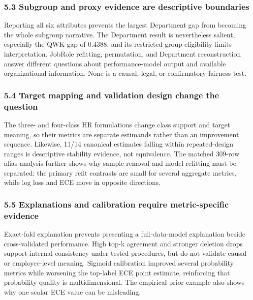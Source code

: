\documentclass[
  a4paper,
  review]{elsarticle}
\begin{document}
\subsubsection{5.3 Subgroup and proxy evidence are descriptive
boundaries}\label{subgroup-and-proxy-evidence-are-descriptive-boundaries}

Reporting all six attributes prevents the largest Department gap from
becoming the whole subgroup narrative. The Department result is
nevertheless salient, especially the QWK gap of 0.4388, and its
restricted group eligibility limits interpretation. JobRole refitting,
permutation, and Department reconstruction answer different questions
about performance-model output and available organizational information.
None is a causal, legal, or confirmatory fairness test.

\subsubsection{5.4 Target mapping and validation design change the
question}\label{target-mapping-and-validation-design-change-the-question}

The three- and four-class HR formulations change class support and
target meaning, so their metrics are separate estimands rather than an
improvement sequence. Likewise, 11/14 canonical estimates falling within
repeated-design ranges is descriptive stability evidence, not
equivalence. The matched 309-row alias analysis further shows why sample
removal and model refitting must be separated: the primary refit
contrasts are small for several aggregate metrics, while log loss and
ECE move in opposite directions.

\subsubsection{5.5 Explanations and calibration require metric-specific
evidence}\label{explanations-and-calibration-require-metric-specific-evidence}

Exact-fold explanation prevents presenting a full-data-model explanation
beside cross-validated performance. High top-k agreement and stronger
deletion drops support internal consistency under tested procedures, but
do not validate causal or employee-level meaning. Sigmoid calibration
improved several probability metrics while worsening the top-label ECE
point estimate, reinforcing that probability quality is
multidimensional. The empirical-prior example also shows why one scalar
ECE value can be misleading.
\end{document}
